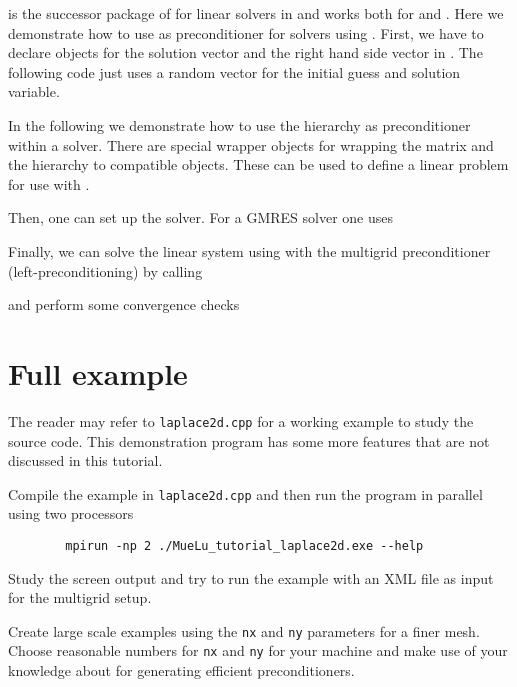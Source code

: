\documentclass[10pt,fleqn]{book}
\providecommand\printCppListing[1]{

}
\begin{document}
\belos is the successor package of \aztecoo for linear solvers in \trilinos and works both for \epetra and \tpetra. Here we demonstrate how to use \muelu as preconditioner for \belos solvers using \xpetra.
First, we have to declare objects for the solution vector and the right hand side vector in \xpetra. The following code just uses a random vector for the initial guess and solution variable.
\printCppListing{ScalingTest.cpp_24.fragment}

In the following we demonstrate how to use the \muelu hierarchy as preconditioner within a \belos solver. There are special wrapper objects for wrapping the \xpetra matrix and the \muelu hierarchy to \belos compatible objects. These can be used to define a linear problem for use with \belos.
\printCppListing{ScalingTest.cpp_26.fragment}

Then, one can set up the \belos solver. For a \belos GMRES solver one uses
\printCppListing{ScalingTest.cpp_28.fragment}
Finally, we can solve the linear system using \belos with the \muelu multigrid preconditioner (left-preconditioning) by calling
\printCppListing{ScalingTest.cpp_30.fragment}
and perform some convergence checks
\printCppListing{ScalingTest.cpp_32.fragment}

\section{Full example}

The reader may refer to \texttt{laplace2d.cpp} for a working example to study the source code. This demonstration program has some more features that are not discussed in this tutorial.

\begin{exercise}
Compile the example in \texttt{laplace2d.cpp} and then run the program in parallel using two processors
        \begin{verbatim}
        mpirun -np 2 ./MueLu_tutorial_laplace2d.exe --help
        \end{verbatim}
        Study the screen output and try to run the example with an XML file as input for the multigrid setup.
\end{exercise}
\begin{exercise}
Create large scale examples using the \verb|nx| and \verb|ny| parameters for a finer mesh. Choose reasonable numbers for \verb|nx| and \verb|ny| for your machine and make use of your knowledge about \muelu for generating efficient preconditioners.
\end{exercise}
\end{document}
